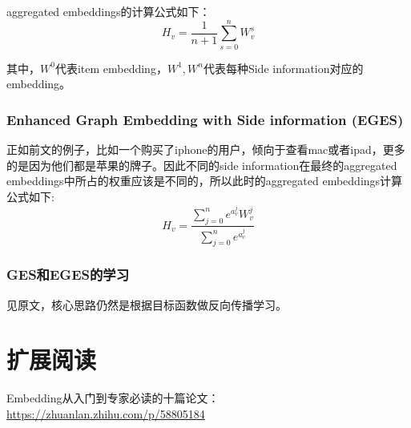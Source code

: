 \documentclass[12pt]{article}
\begin{document}
aggregated embeddings的计算公式如下：
$$
H_v = \frac{1}{n+1} \sum_{s=0}^nW_v^s
$$

其中，$W^0$代表item embedding，$W^1,W^n$代表每种Side information对应的embedding。

\subsubsection{Enhanced Graph Embedding with Side information (EGES)}
正如前文的例子，比如一个购买了iphone的用户，倾向于查看mac或者ipad，更多的是因为他们都是苹果的牌子。因此不同的side information在最终的aggregated embeddings中所占的权重应该是不同的，所以此时的aggregated embeddings计算公式如下:
$$
H_v = \frac{\sum_{j=0}^ne^{a^j_v}W^j_v}{\sum_{j=0}^ne^{a^j_v}}
$$

\subsubsection{GES和EGES的学习}
见原文，核心思路仍然是根据目标函数做反向传播学习。


\section{扩展阅读}
Embedding从入门到专家必读的十篇论文：\url{https://zhuanlan.zhihu.com/p/58805184}



\end{document}
